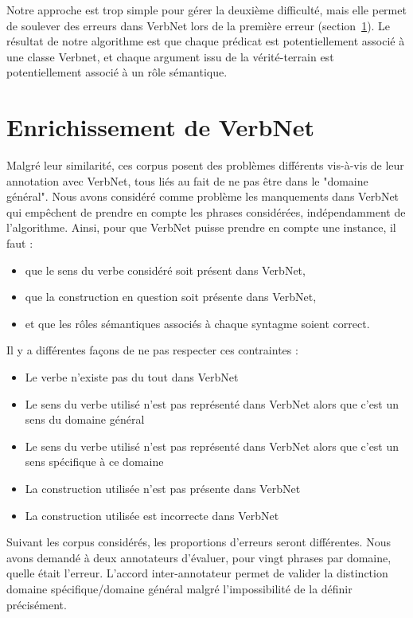 Notre approche est trop simple pour gérer la deuxième difficulté, mais elle
permet de soulever des erreurs dans VerbNet lors de la première erreur
(section~\ref{sec:enrichissement_verbnet}). Le résultat de notre algorithme
est que chaque prédicat est potentiellement associé à une classe Verbnet, et
chaque argument issu de la vérité-terrain est potentiellement associé à un rôle
sémantique.

\section{Enrichissement de VerbNet}
\label{sec:enrichissement_verbnet}

Malgré leur similarité, ces corpus posent des problèmes différents vis-à-vis de
leur annotation avec VerbNet, tous liés au fait de ne pas être dans le "domaine
général". Nous avons considéré comme problème les manquements dans VerbNet qui
empêchent de prendre en compte les phrases considérées, indépendamment de
l'algorithme. Ainsi, pour que VerbNet puisse prendre en compte une instance, il
faut :

\begin{itemize}
    \item que le sens du verbe considéré soit présent dans VerbNet,
    \item que la construction en question soit présente dans VerbNet,
    \item et que les rôles sémantiques associés à chaque syntagme soient correct.
\end{itemize}

Il y a différentes façons de ne pas respecter ces contraintes :

\begin{itemize}
    \item Le verbe n'existe pas du tout dans VerbNet
    \item Le sens du verbe utilisé n'est pas représenté dans VerbNet alors que c'est un sens du domaine général
    \item Le sens du verbe utilisé n'est pas représenté dans VerbNet alors que c'est un sens spécifique à ce domaine
    \item La construction utilisée n'est pas présente dans VerbNet
    \item La construction utilisée est incorrecte dans VerbNet
\end{itemize}

Suivant les corpus considérés, les proportions d'erreurs seront différentes.
Nous avons demandé à deux annotateurs d'évaluer, pour vingt phrases par
domaine, quelle était l'erreur. L'accord inter-annotateur permet de valider la
distinction domaine spécifique/domaine général malgré l'impossibilité de la
définir précisément. %

